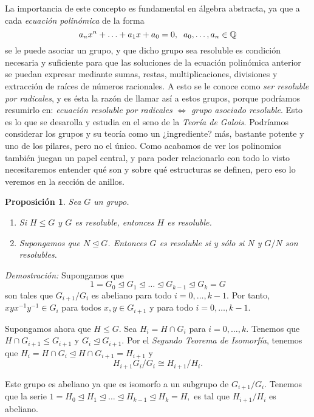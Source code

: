 \documentclass[12pt]{article}
\newtheorem{proposition}[theorem]{Proposición}
\begin{document}
La importancia de este concepto es fundamental en álgebra abstracta, ya que a cada \textit{ecuación polinómica} de la forma $$a_{n}x^{n} + \ldots + a_{1}x + a_{0} = 0, \hspace{0.2cm} a_{0}, \ldots , a_{n} \in \mathbb{Q}$$ se le puede asociar un grupo, y que dicho grupo sea resoluble es condición necesaria y suficiente para que las soluciones de la ecuación polinómica anterior se puedan expresar mediante sumas, restas, multiplicaciones, divisiones y extracción de raíces de números racionales. A esto se le conoce como \textit{ser resoluble por radicales}, y es ésta la razón de llamar así a estos grupos, porque podríamos resumirlo en: \textit{ecuación resoluble por radicales} $\Longleftrightarrow$ \textit{grupo asociado resoluble}. Esto es lo que se desarolla y estudia en el seno de la \textit{Teoría de Galois}. Podríamos considerar los grupos y su teoría como un ¿ingrediente? más, bastante potente y uno de los pilares, pero no el único. Como acabamos de ver los polinomios también juegan un papel central, y para poder relacionarlo con todo lo visto necesitaremos entender qué son y sobre qué estructuras se definen, pero eso lo veremos en la sección de anillos.

\begin{proposition} \label{eq:reso1} Sea $G$ un grupo.
\begin{enumerate}
\item Si $H \leq G$ y $G$ es resoluble, entonces $H$ es resoluble.
\item Supongamos que $N \unlhd G$. Entonces $G$ es resoluble si y sólo si $N$ y $G/N$ son resolubles.
\end{enumerate}
\end{proposition}
\emph{Demostración: }Supongamos que $$1 = G_0 \unlhd G_1 \unlhd \ldots \unlhd G_{k-1} \unlhd G_k = G$$ son tales que $G_{i+1}/G_i$ es abeliano para todo $i = 0, \ldots, k-1$. Por tanto, $xyx^{-1}y^{-1} \in G_i$ para todos $x,y \in G_{i+1}$ y para todo $i = 0, \ldots, k -1$.

Supongamos ahora que $H \leq G$. Sea $H_i = H \cap G_i$ para $i = 0, \ldots, k$. Tenemos que $H \cap G_{i+1} \leq G_{i+1}$ y $G_i \unlhd G_{i+1}$. Por el \textit{Segundo Teorema de Isomorfía}, tenemos que $H_i = H \cap G_i \unlhd H \cap G_{i+1} = H_{i+1}$ y $$H_{i+1}G_i/G_i \cong H_{i+1}/H_{i}.$$

Este grupo es abeliano ya que es isomorfo a un subgrupo de $G_{i+1}/G_i$. Tenemos que la serie $1 = H_0 \unlhd H_1 \unlhd \ldots \unlhd H_{k-1} \unlhd H_k = H,$ es tal que $H_{i+1}/H_{i}$ es abeliano. 
\end{document}
